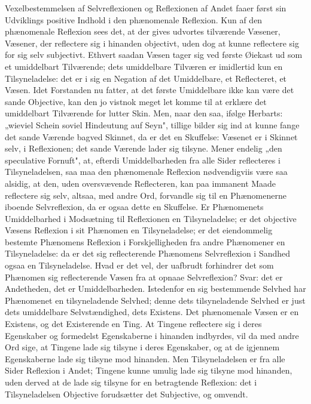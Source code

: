 \documentclass[12pt]{book}
\newcommand{\opage}[1]{\marginnote{\footnotesize\textit{[#1]}}}
\begin{document}
Vexelbestemmelsen af Selvreflexionen og Reflexionen af Andet faaer først sin
Udviklings positive Indhold i den phænomenale Reflexion. Kun af den phænomenale
Reflexion sees det, at der gives udvortes tilværende Væsener, Væsener, der reflectere
sig i hinanden objectivt, uden dog at kunne reflectere sig for sig selv subjectivt.
Ethvert saadan Væsen tager sig ved første Øiekast ud som et umiddelbart Tilværende;
dets umiddelbare Tilværen er imidlertid kun en Tilsyneladelse: det er i sig en
Negation af det Umiddelbare, et Reflecteret, et Væsen. Idet Forstanden nu fatter, at
det første Umiddelbare ikke kan være det sande Objective, kan den jo vistnok meget
let komme til at erklære det umiddelbart Tilværende for lutter Skin. Men, naar den
saa, ifølge Herbarts: „wieviel Schein soviel Hindeutung auf Seyn", tillige bilder sig
ind at kunne fange det sande Værende bagved Skinnet, da er det en Skuffelse: Væsenet
er i Skinnet selv, i Reflexionen; det sande Værende lader sig tilsyne. Mener endelig
„den speculative
\opage{84} Fornuft", at, efterdi Umiddelbarheden fra alle Sider reflecteres i Tilsyneladelsen,
saa maa den phænomenale Reflexion nødvendigviis være saa alsidig, at den, uden
oversvævende Reflecteren, kan paa immanent Maade reflectere sig selv, altsaa, med
andre Ord, forvandle sig til en Phænomenerne iboende Selvreflexion, da er ogsaa dette
en Skuffelse. Er Phænomenets Umiddelbarhed i Modsætning til Reflexionen en
Tilsyneladelse; er det objective Væsens Reflexion i sit Phænomen en Tilsyneladelse; er
det eiendommelig bestemte Phænomens Reflexion i Forskjelligheden fra andre Phænomener
en Tilsyneladelse: da er det sig reflecterende Phænomens Selvreflexion i Sandhed
ogsaa en Tilsyneladelse. Hvad er det vel, der uafbrudt forhindrer det som Phænomen
sig reflecterende Væsen fra at opnaae Selvreflexion? Svar: det er Andetheden, det er
Umiddelbarheden. Istedenfor en sig bestemmende Selvhed har Phænomenet en
tilsyneladende Selvhed; denne dets tilsyneladende Selvhed er just dets umiddelbare
Selvstændighed, dets Existens. Det phænomenale Væsen er en Existens, og det
Existerende en Ting. At Tingene reflectere sig i deres Egenskaber og formedelst
Egenskaberne i hinanden indbyrdes, vil da med andre Ord sige, at Tingene lade sig
tilsyne i deres Egenskaber, og at de igjennem Egenskaberne lade sig tilsyne mod
hinanden. Men Tilsyneladelsen er fra alle Sider Reflexion i Andet; Tingene kunne
umulig lade sig tilsyne mod hinanden, uden derved at de lade sig tilsyne for en
betragtende Reflexion: det i Tilsyneladelsen Objective forudsætter det Subjective, og
omvendt.
\end{document}
